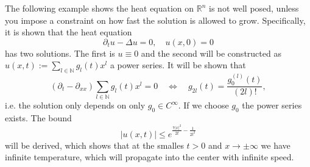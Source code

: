 \documentclass[A4,12pt,twoside]{book}
\begin{document}
The following example shows the heat equation on $\mathbb{R}^n$ is not well posed, unless you impose a constraint on how fast the solution is allowed to grow. Specifically, it is shown that the heat equation 
\[
\partial_t u - \Delta u=0, \quad u(x,0)=0
\]
has two solutions. The first is $u\equiv 0$ and the second will be constructed as $u(x,t) := \sum_{l \in \mathbb{N}} g_l (t) x^l$ a power series. It will be shown that 
\[
 (\partial_t- \partial_{xx})\sum_{l \in \mathbb{N}} g_l (t) x^l=0 \quad \iff \quad g_{2l} (t) = \frac{g_0^{(l)} (t)}{(2l)!},
\]
i.e. the solution only depends on only $g_0 \in C^\infty$. If we choose $g_0$ the power series exists. The bound 
\[
|u(x,t)| \leq e^{\frac{7|x|^2}{2t} - \frac{1}{2t^2}}
\]
will be derived, which shows that at the smalles $t>0$ and $x \to \pm \infty$ we have infinite temperature, which will propagate into the center with infinite speed.
\end{document}
